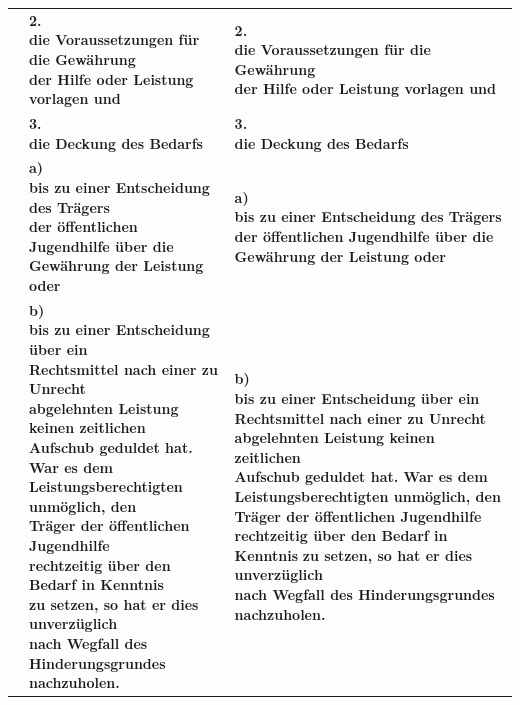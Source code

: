 \documentclass[10pt,a4paper,landscape]{article}
\begin{document}
\begin{longtable}{|L{8.2cm}|L{8.2cm}|L{8.2cm}|}
\hhline{|---|}
 & \textbf{2.   \newline die Voraussetzungen für die Gewährung  \newline der Hilfe oder Leistung vorlagen und } & \textbf{2.   \newline die Voraussetzungen für die Gewährung  \newline der Hilfe oder Leistung vorlagen und } \\
\hhline{|---|}
 & \textbf{3.   \newline die Deckung des Bedarfs } & \textbf{3.   \newline die Deckung des Bedarfs } \\
\hhline{|---|}
 & \textbf{a)   \newline bis zu einer Entscheidung des Trägers  \newline der öffentlichen Jugendhilfe über die  \newline Gewährung der Leistung oder } & \textbf{a)   \newline bis zu einer Entscheidung des Trägers  \newline der öffentlichen Jugendhilfe über die  \newline Gewährung der Leistung oder } \\
\hhline{|---|}
 & \textbf{b)   \newline bis zu einer Entscheidung über ein  \newline Rechtsmittel nach einer zu Unrecht  \newline abgelehnten Leistung keinen zeitlichen  \newline Aufschub geduldet hat. War es dem  \newline Leistungsberechtigten unmöglich, den  \newline Träger der öffentlichen Jugendhilfe  \newline rechtzeitig über den Bedarf in Kenntnis  \newline zu setzen, so hat er dies unverzüglich  \newline nach Wegfall des Hinderungsgrundes  \newline nachzuholen. } & \textbf{b)   \newline bis zu einer Entscheidung über ein  \newline Rechtsmittel nach einer zu Unrecht  \newline abgelehnten Leistung keinen zeitlichen  \newline Aufschub geduldet hat. War es dem  \newline Leistungsberechtigten unmöglich, den  \newline Träger der öffentlichen Jugendhilfe  \newline rechtzeitig über den Bedarf in Kenntnis } \textbf{zu setzen, so hat er dies unverzüglich  \newline nach Wegfall des Hinderungsgrundes  \newline nachzuholen. } \\

\end{longtable}
\end{document}
